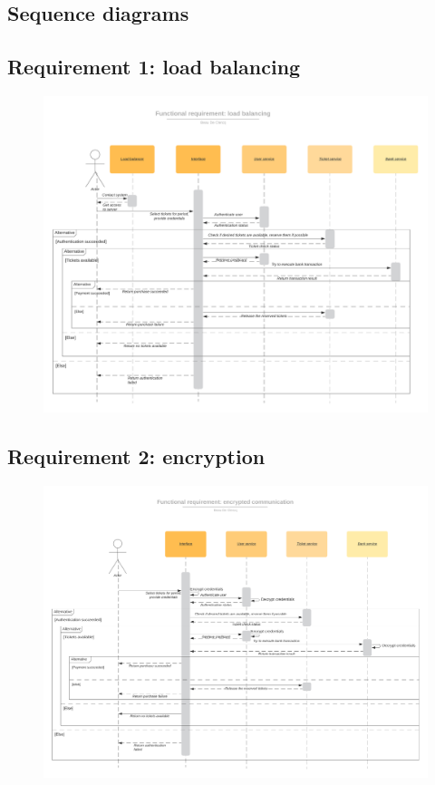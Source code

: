 \documentclass[conference]{IEEEtran}
\begin{document}
\begin{appendices}
	\clearpage
	\newpage
	\section{Sequence diagrams}
	\subsection{Requirement 1: load balancing}
		\begin{figure}[h]
			\includegraphics*[scale=0.7]{diagrams/FR1.png}
		\end{figure}
	\clearpage
	\newpage
	\subsection{Requirement 2: encryption}
		\begin{figure}[h]
			\includegraphics*[scale=0.7]{diagrams/FR2.png}
		\end{figure}
	\clearpage
	\newpage

\end{appendices}
\end{document}
